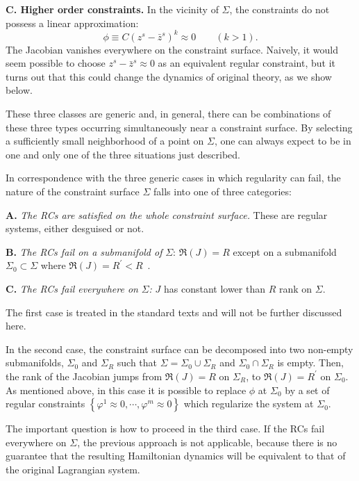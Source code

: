 \documentclass[a4paper,thmsa,11pt]{article}
\begin{document}
\textbf{C. Higher order constraints. }In the vicinity of $\Sigma $, the
constraints do not possess a linear approximation:
\begin{equation}
\phi \equiv C\left( z^{s}-\bar{z}^{s}\right) ^{k}\approx 0\qquad \left(
k>1\right) .  \label{high-order}
\end{equation}
The Jacobian vanishes everywhere on the constraint surface. Naively, it
would seem possible to choose $z^{s}-\bar{z}^{s}\approx 0$ as an equivalent
regular constraint, but it turns out that this could change the dynamics of
original theory, as we show below.

These three classes are generic and, in general, there can be combinations
of these three types occurring simultaneously near a constraint surface. By
selecting a sufficiently small neighborhood of a point on $\Sigma $, one can
always expect to be in one and only one of the three situations just
described.

In correspondence with the three generic cases in which regularity can fail,
the nature of the constraint surface $\Sigma $ falls into one of three
categories:\medskip

\textbf{A. }\emph{The RCs are satisfied on the whole constraint surface. }%
These are regular systems, either desguised or not.

\textbf{B. }\emph{The RCs fail on a submanifold of }$\Sigma $: $\Re \left(
J\right) =R$ except on a submanifold $\Sigma _{0}\subset \Sigma $ where $\Re
\left( J\right) =R^{\prime }<R$\ .

\textbf{C. }\emph{The RCs fail everywhere on }$\Sigma $\emph{:} $J$ has
constant lower than $R$ rank on $\Sigma $.\medskip

The first case is treated in the standard texts and will not be further
discussed here.

In the second case, the constraint surface can be decomposed into two
non-empty submanifolds, $\Sigma _{0}$ and $\Sigma _{R}$ such that $\Sigma
=\Sigma _{0}\cup \Sigma _{R}$ and $\Sigma _{0}\cap \Sigma _{R}$ is empty.
Then, the rank of the Jacobian jumps from $\Re \left( J\right) =R$ on $%
\Sigma _{R}$, to $\Re \left( J\right) =R^{\prime }$ on $\Sigma _{0}$. As
mentioned above, in this case it is possible to replace $\phi $ at $\Sigma
_{0}$ by a set of regular constraints $\left\{ \varphi ^{1}\approx 0,\cdots ,%
\varphi ^{m}\approx 0\right\} $ which regularize the system at $%
\Sigma _{0}$.

The important question is how to proceed in the third case. If the RCs fail
everywhere on $\Sigma $, the previous approach is not applicable, because
there is no guarantee that the resulting Hamiltonian dynamics will be
equivalent to that of the original Lagrangian system.
\end{document}
